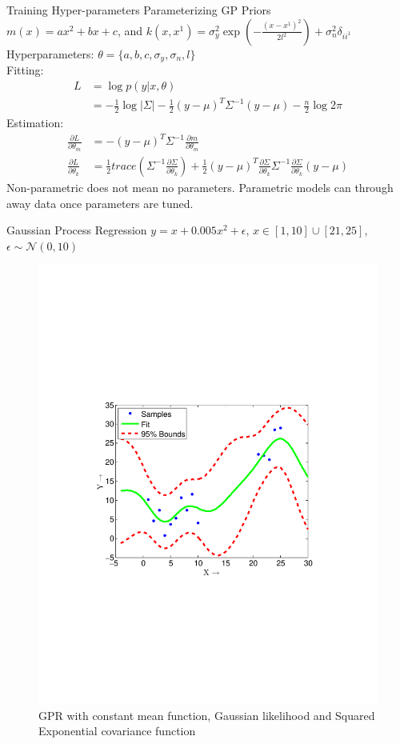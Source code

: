 \begin{frame}{Training Hyper-parameters}
    Parameterizing GP Priors \\
    $m(x) = ax^2+bx+c$, and $k(x,x^1) = \sigma_y^2\exp{(-\frac{(x-x^1)^2}{2l^2})}+\sigma^2_n\delta_{ii^1}$ \\
    Hyperparameters: $\theta = \{a,b,c,\sigma_y,\sigma_n,l\}$ \\
    Fitting:
    \begin{align}
        L &= \log{p(y|x,\theta)} \nonumber\\
          &= -\frac{1}{2}\log|\Sigma| - \frac{1}{2} (y-\mu)^T\Sigma^{-1}(y-\mu) -
        \frac{n}{2}\log{2\pi}
    \end{align}
    Estimation:
    \begin{align}
        \frac{\partial L}{\partial \theta_m}& = -(y-\mu)^T\Sigma^{-1}\frac{\partial m}{\partial \theta_m} \nonumber \\
        \frac{\partial L}{\partial \theta_k}& = \frac{1}{2} trace(\Sigma^{-1}\frac{\partial \Sigma}{\partial \theta_k})+\frac{1}{2}(y-\mu)^T\frac{\partial \Sigma}{\partial \theta_k}\Sigma^{-1}\frac{\partial \Sigma}{\partial \theta_k}(y-\mu)
    \end{align}
Non-parametric does not mean no parameters. Parametric models can through
    away data once parameters are tuned.
\end{frame}

\begin{frame}{Gaussian Process Regression}
$y = x+0.005x^2+ \epsilon$, $x \in [1,10] \cup [21,25]$,  $\epsilon \sim \mathcal{N}(0,10)$ 
\begin{figure}
\centering
\includegraphics[width=0.5\linewidth,trim=30mm 80mm 40mm 70mm,clip]{figures/gpml_fit}
\caption{ GPR with constant mean function, Gaussian likelihood and Squared Exponential covariance function}
\end{figure}
\end{frame}


